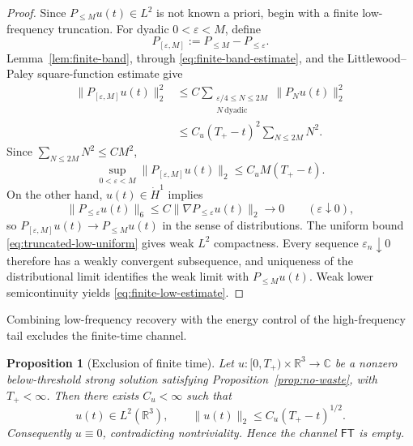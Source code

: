 \documentclass{interact}
\numberwithin{equation}{section}
\theoremstyle{plain}
\newtheorem{proposition}[theorem]{Proposition}
\theoremstyle{definition}
\theoremstyle{remark}
\newcommand{\R}{\mathbb R}
\newcommand{\C}{\mathbb C}
\begin{document}
\begin{proof}
Since $P_{\le M}u(t)\in L^2$ is not known a priori, begin with a finite low-frequency truncation. For dyadic $0<\varepsilon<M$, define
\[
 P_{[\varepsilon,M]}:=P_{\le M}-P_{\le\varepsilon}.
\]
Lemma~\ref{lem:finite-band}, through \eqref{eq:finite-band-estimate}, and the Littlewood--Paley square-function estimate give
\begin{align*}
 \|P_{[\varepsilon,M]}u(t)\|_2^2
 &\le C\sum_{\substack{\varepsilon/4\le N\le2M\\N\ \mathrm{dyadic}}}
 \|P_Nu(t)\|_2^2\\
 &\le C_u(T_+-t)^2\sum_{N\le2M}N^2.
\end{align*}
Since $\sum_{N\le2M}N^2\le CM^2$,
\begin{equation}\label{eq:truncated-low-uniform}
 \sup_{0<\varepsilon<M}
 \|P_{[\varepsilon,M]}u(t)\|_2
 \le C_uM(T_+-t).
\end{equation}
On the other hand, $u(t)\in\dot H^1$ implies
\[
 \|P_{\le\varepsilon}u(t)\|_6
 \le C\|\nabla P_{\le\varepsilon}u(t)\|_2
 \longrightarrow0
 \qquad(\varepsilon\downarrow0),
\]
so $P_{[\varepsilon,M]}u(t)\to P_{\le M}u(t)$ in the sense of distributions. The uniform bound \eqref{eq:truncated-low-uniform} gives weak $L^2$ compactness. Every sequence $\varepsilon_n\downarrow0$ therefore has a weakly convergent subsequence, and uniqueness of the distributional limit identifies the weak limit with $P_{\le M}u(t)$. Weak lower semicontinuity yields \eqref{eq:finite-low-estimate}.
\end{proof}

Combining low-frequency recovery with the energy control of the high-frequency tail excludes the finite-time channel.

\begin{proposition}[Exclusion of finite time]\label{prop:finite-time-exclusion}
Let $u:[0,T_+)\times\R^3\to\C$ be a nonzero below-threshold strong solution satisfying Proposition~\ref{prop:no-waste}, with $T_+<\infty$. Then there exists $C_u<\infty$ such that
\begin{equation}\label{eq:finite-time-mass-decay}
 u(t)\in L^2(\R^3),
 \qquad
 \|u(t)\|_2\le C_u(T_+-t)^{1/2}.
\end{equation}
Consequently $u\equiv0$, contradicting nontriviality. Hence the channel $\mathsf{FT}$ is empty.
\end{proposition}
\end{document}
